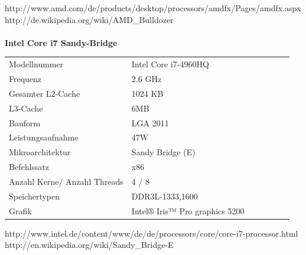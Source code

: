 \documentclass[10pt]{article}
\begin{document}
\begin{enumerate}[label=\alph*)]
	
	
	http://www.amd.com/de/products/desktop/processors/amdfx/Pages/amdfx.aspx\\
	http://de.wikipedia.org/wiki/AMD\_Bulldozer\\
	\\
	
	\textbf{Intel Core i7 Sandy-Bridge}\\
	\begin{tabular}{ l l l l l l l }
			Modellnummer & Intel Core i7-4960HQ\\
			Frequenz & 2.6 GHz\\
			Gesamter L2-Cache & 1024 KB\\
			L3-Cache & 6MB\\
			Bauform & LGA 2011\\ 
			Leistungsaufnahme & 47W\\
			Mikroarchitektur & Sandy Bridge (E)\\
			Befehlssatz & x86 \\
			Anzahl Kerne/ Anzahl Threads & 4 / 8\\
			Speichertypen & DDR3L-1333,1600\\
			Grafik & Intel® Iris™ Pro graphics 5200\\
		\end{tabular}

	
	
	
	
	http://www.intel.de/content/www/de/de/processors/core/core-i7-processor.html\\
	http://en.wikipedia.org/wiki/Sandy\_Bridge-E\\
\end{enumerate}
\end{document}
